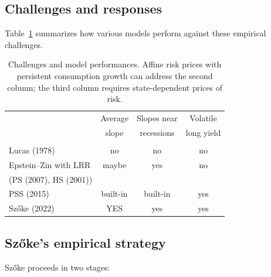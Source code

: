 \documentclass[12pt]{article}
\theoremstyle{definition}
\begin{document}
\subsection{Challenges and responses}

Table~\ref{tab:challenges} summarizes how various models perform against
these empirical challenges.

\begin{table}[H]
\begin{center}
\begin{tabular}{lccc}
& Average   & Slopes near  & Volatile\\
& slope    & recessions & long yield \\
\hline\\[-6pt]
Lucas (1978)  &  no & no & no \\[4pt]
Epstein--Zin with LRR & maybe & yes & no \\
\quad (PS (2007), HS (2001)) & & & \\[4pt]
PSS (2015) &  built-in  &  built-in & yes \\[4pt]
Sz\H{o}ke (2022) & YES  & yes & yes \\[4pt]
\end{tabular}
\end{center}
\caption{Challenges and model performances.  Affine risk prices with
persistent consumption growth can address the second column; the third
column requires state-dependent prices of risk.}
\label{tab:challenges}
\end{table}

\subsection{Sz\H{o}ke's empirical strategy}

Sz\H{o}ke proceeds in two stages:
\end{document}

